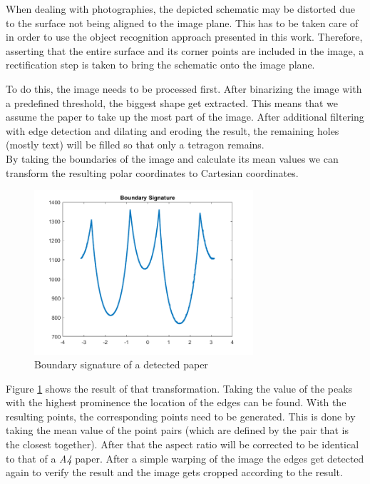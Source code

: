 \documentclass[10pt,twocolumn,letterpaper]{article}
\begin{document}
When dealing with photographies, the depicted schematic may be distorted due to the surface not being aligned to the image plane. This has to be taken care of in order to use the object recognition approach presented in this work. Therefore, asserting that the entire surface and its corner points are included in the image, a rectification step is taken to bring the schematic onto the image plane.
\par

To do this, the image needs to be processed first. After binarizing the image with a predefined threshold, the biggest shape get extracted. This means that we assume the paper to take up the most part of the image. After additional filtering with edge detection and dilating and eroding the result, the remaining holes (mostly text) will be filled so that only a tetragon remains.\\
By taking the boundaries of the image and calculate its mean values we can transform the resulting polar coordinates to Cartesian coordinates.

\begin{figure}[!ht]
\includegraphics[width = 3.2in]{img/sig.png}
\caption{Boundary signature of a detected paper}
\label{fig:sig}
\end{figure}

Figure \ref{fig:sig} shows the result of that transformation. Taking the value of the peaks with the highest prominence the location of the edges can be found. With the resulting points, the corresponding points need to be generated. This is done by taking the mean value of the point pairs (which are defined by the pair that is the closest together). After that the aspect ratio will be corrected to be identical to that of a \textit{A4} paper. After a simple warping of the image the edges get detected again to verify the result and the image gets cropped according to the result.

\par
\end{document}
